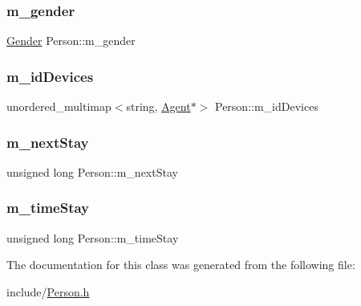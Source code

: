 \subsubsection{\texorpdfstring{m\_gender}{m\_gender}}
{\footnotesize\ttfamily \mbox{\hyperlink{class_person_aff84ca16bd4dbf364614d86f20b29dd2}{Gender}} Person\+::m\+\_\+gender\hspace{0.3cm}{\ttfamily [private]}}

\mbox{\label{class_person_a95b2e60a54b72aea51a7600048e76291}} 
\subsubsection{\texorpdfstring{m\_idDevices}{m\_idDevices}}
{\footnotesize\ttfamily unordered\+\_\+multimap$<$string, \mbox{\hyperlink{class_agent}{Agent}}$\ast$$>$ Person\+::m\+\_\+id\+Devices\hspace{0.3cm}{\ttfamily [private]}}

\mbox{\label{class_person_ad8809184fc32b28b1bcc115b10493b55}} 
\subsubsection{\texorpdfstring{m\_nextStay}{m\_nextStay}}
{\footnotesize\ttfamily unsigned long Person\+::m\+\_\+next\+Stay\hspace{0.3cm}{\ttfamily [private]}}

\mbox{\label{class_person_a5554109f1f3a7c466f02346d0061c6e7}} 
\subsubsection{\texorpdfstring{m\_timeStay}{m\_timeStay}}
{\footnotesize\ttfamily unsigned long Person\+::m\+\_\+time\+Stay\hspace{0.3cm}{\ttfamily [private]}}



The documentation for this class was generated from the following file\+:\begin{DoxyCompactItemize}
\item 
include/\mbox{\hyperlink{_person_8h}{Person.\+h}}\end{DoxyCompactItemize}
